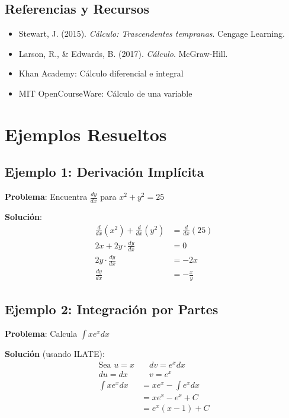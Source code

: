 \documentclass{article}
\newcommand{\formula}[1]{\ensuremath{#1}}
\begin{document}
\subsection*{Referencias y Recursos}
\begin{itemize}
    \item Stewart, J. (2015). \textit{Cálculo: Trascendentes tempranas}. Cengage Learning.
    \item Larson, R., \& Edwards, B. (2017). \textit{Cálculo}. McGraw-Hill.
    \item Khan Academy: Cálculo diferencial e integral
    \item MIT OpenCourseWare: Cálculo de una variable
\end{itemize}

\newpage
\appendix
\section{Ejemplos Resueltos}

\subsection{Ejemplo 1: Derivación Implícita}
\begin{tcolorbox}[colback=gray!5!white, colframe=black]
\textbf{Problema}: Encuentra \formula{\frac{dy}{dx}} para \formula{x^2 + y^2 = 25}

\textbf{Solución}:
\begin{align*}
\frac{d}{dx}(x^2) + \frac{d}{dx}(y^2) &= \frac{d}{dx}(25) \\
2x + 2y \cdot \frac{dy}{dx} &= 0 \\
2y \cdot \frac{dy}{dx} &= -2x \\
\frac{dy}{dx} &= -\frac{x}{y}
\end{align*}
\end{tcolorbox}

\subsection{Ejemplo 2: Integración por Partes}
\begin{tcolorbox}[colback=gray!5!white, colframe=black]
\textbf{Problema}: Calcula \formula{\int x e^x dx}

\textbf{Solución} (usando ILATE):
\begin{align*}
\text{Sea } u = x &\quad dv = e^x dx \\
du = dx &\quad v = e^x \\
\int x e^x dx &= x e^x - \int e^x dx \\
&= x e^x - e^x + C \\
&= e^x(x - 1) + C
\end{align*}
\end{tcolorbox}
\end{document}
